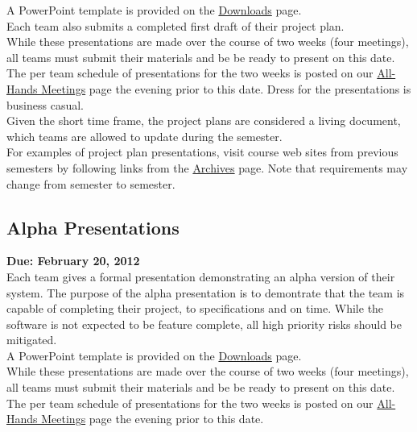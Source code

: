 \documentclass[11pt,a4paper,oneside]{article}
\begin{document}
A PowerPoint template is provided on the \href {http://www.cse.msu.edu/~cse498/2012-01/other-links/downloads}{Downloads} page.\\

Each team also submits a completed first draft of their project plan.\\

While these presentations are made over the course of two weeks (four meetings), all teams must submit their materials and be be ready to present on this date. The per team schedule of presentations for the two weeks is posted on our \href{http://www.cse.msu.edu/~cse498/2012-01/schedules/all-hands-meetings}{All-Hands Meetings} page the evening prior to this date. Dress for the presentations is business casual.\\

Given the short time frame, the project plans are considered a living document, which teams are allowed to update during the semester.\\

For examples of project plan presentations, visit course web sites from previous semesters by following links from the \href{http://www.cse.msu.edu/~cse498/2012-01/archives}{Archives} page. Note that requirements may change from semester to semester.\\

\subsection{Alpha Presentations}
\textbf{Due: February 20, 2012}\\

Each team gives a formal presentation demonstrating an alpha version of their system. The purpose of the alpha presentation is to demontrate that the team is capable of completing their project, to specifications and on time. While the software is not expected to be feature complete, all high priority risks should be mitigated.\\

A PowerPoint template is provided on the \href {http://www.cse.msu.edu/~cse498/2012-01/other-links/downloads}{Downloads} page.\\	

While these presentations are made over the course of two weeks (four meetings), all teams must submit their materials and be be ready to present on this date. The per team schedule of presentations for the two weeks is posted on our \href{http://www.cse.msu.edu/~cse498/2012-01/schedules/all-hands-meetings}{All-Hands Meetings} page the evening prior to this date.\\
\end{document}
